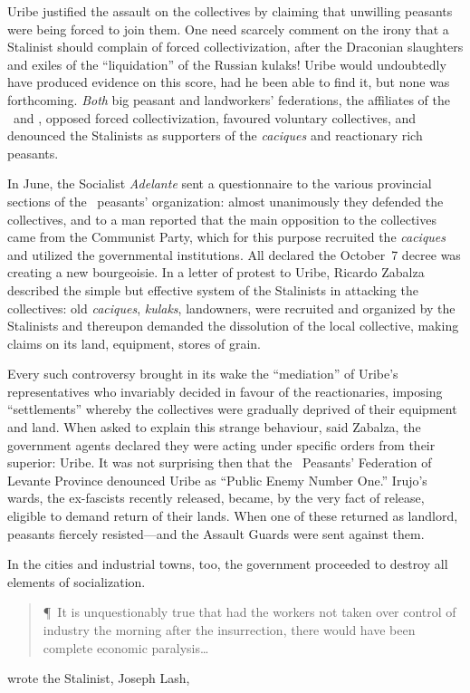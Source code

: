 Uribe justified the assault on the collectives by claiming that unwilling peasants were being forced to join them. One need scarcely comment on the irony that a Stalinist should complain of forced collectivization, after the Draconian slaughters and exiles of the ``liquidation'' of the Russian kulaks! Uribe would undoubtedly have produced evidence on this score, had he been able to find it, but none was forthcoming. \emph{Both} big peasant and landworkers’ federations, the affiliates of the \CNT\ and \UGT, opposed forced collectivization, favoured voluntary collectives, and denounced the Stalinists as supporters of the \emph{caciques} and reactionary rich peasants.

In June, the Socialist \emph{Adelante} sent a questionnaire to the various provincial sections of the \UGT\ peasants’ organization: almost unanimously they defended the collectives, and to a man reported that the main opposition to the collectives came from the Communist Party, which for this purpose recruited the \emph{caciques} and utilized the governmental institutions. All declared the October~7 decree was creating a new bourgeoisie. In a letter of protest to Uribe, Ricardo Zabalza described the simple but effective system of the Stalinists in attacking the collectives: old \emph{caciques}, \emph{kulaks}, landowners, were recruited and organized by the Stalinists and thereupon demanded the dissolution of the local collective, making claims on its land, equipment, stores of grain.

Every such controversy brought in its wake the ``mediation'' of Uribe’s representatives who invariably decided in favour of the reactionaries, imposing ``settlements'' whereby the collectives were gradually deprived of their equipment and land. When asked to explain this strange behaviour, said Zabalza, the government agents declared they were acting under specific orders from their superior: Uribe. It was not surprising then that the \UGT\ Peasants’ Federation of Levante Province denounced Uribe as ``Public Enemy Number One.'' Irujo’s wards, the ex-fascists recently released, became, by the very fact of release, eligible to demand return of their lands. When one of these returned as landlord, peasants fiercely resisted---and the Assault Guards were sent against them.

In the cities and industrial towns, too, the government proceeded to destroy all elements of socialization.

\medskip

\begin{quotation}
  \P\ It is unquestionably true that had the workers not taken over control of industry the morning after the insurrection, there would have been complete economic paralysis\dots
\end{quotation}
wrote the Stalinist, Joseph Lash,

